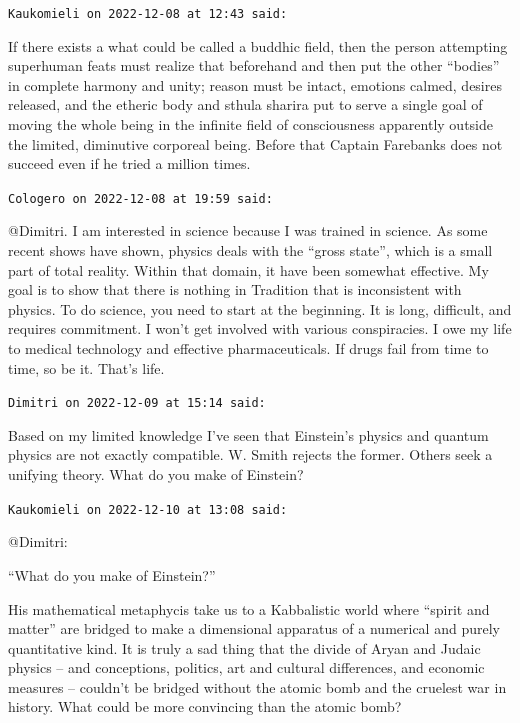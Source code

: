 \begin{footnotesize}
\begin{sffamily}
\hfill

\texttt{Kaukomieli on 2022-12-08 at 12:43 said:}

If there exists a what could be called a buddhic field, then the person attempting superhuman feats must realize that beforehand and then put the other ``bodies'' in complete harmony and unity; reason must be intact, emotions calmed, desires released, and the etheric body and sthula sharira put to serve a single goal of moving the whole being in the infinite field of consciousness apparently outside the limited, diminutive corporeal being. Before that Captain Farebanks does not succeed even if he tried a million times.

\hfill

\texttt{Cologero on 2022-12-08 at 19:59 said:}

@Dimitri. I am interested in science because I was trained in science. As some recent shows have shown, physics deals with the ``gross state'', which is a small part of total reality. Within that domain, it have been somewhat effective. My goal is to show that there is nothing in Tradition that is inconsistent with physics. To do science, you need to start at the beginning. It is long, difficult, and requires commitment. I won't get involved with various conspiracies. I owe my life to medical technology and effective pharmaceuticals. If drugs fail from time to time, so be it. That's life.

\hfill

\texttt{Dimitri on 2022-12-09 at 15:14 said:}

Based on my limited knowledge I've seen that Einstein's physics and quantum physics are not exactly compatible. W. Smith rejects the former. Others seek a unifying theory. What do you make of Einstein?

\hfill

\texttt{Kaukomieli on 2022-12-10 at 13:08 said:}

@Dimitri:

``What do you make of Einstein?''

His mathematical metaphycis take us to a Kabbalistic world where ``spirit and matter'' are bridged to make a dimensional apparatus of a numerical and purely quantitative kind. It is truly a sad thing that the divide of Aryan and Judaic physics -- and conceptions, politics, art and cultural differences, and economic measures -- couldn't be bridged without the atomic bomb and the cruelest war in history. What could be more convincing than the atomic bomb?


\hfill

\end{sffamily}
\end{footnotesize}

